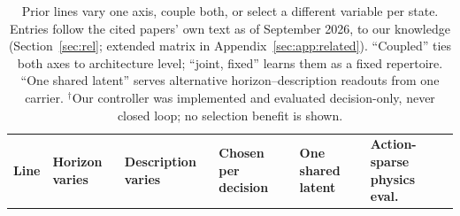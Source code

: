 \begin{table}[t]
\centering
\footnotesize
\setlength{\tabcolsep}{2pt}
\renewcommand{\arraystretch}{.90}
\caption{Prior lines vary one axis, couple both, or select a different variable per state. Entries follow the cited papers' own text as of September 2026, to our knowledge (Section~\ref{sec:rel}; extended matrix in Appendix~\ref{sec:app:related}). ``Coupled'' ties both axes to architecture level; ``joint, fixed'' learns them as a fixed repertoire. ``One shared latent'' serves alternative horizon--description readouts from one carrier. $^{\dagger}$Our controller was implemented and evaluated decision-only, never closed loop; no selection benefit is shown.}
\label{tab:rel:gap}
\begin{tabular}{@{}>{\raggedright\arraybackslash}p{.32\linewidth}>{\raggedright\arraybackslash}p{.12\linewidth}>{\raggedright\arraybackslash}p{.12\linewidth}>{\raggedright\arraybackslash}p{.13\linewidth}>{\raggedright\arraybackslash}p{.12\linewidth}>{\raggedright\arraybackslash}p{.12\linewidth}@{}}
\toprule
\rowcolor{tableheader}\textbf{Line} & \textbf{Horizon varies} & \textbf{Description varies} & \textbf{Chosen per decision} & \textbf{One shared latent} & \textbf{Action-sparse physics eval.} \\

\end{tabular}
\end{table}

